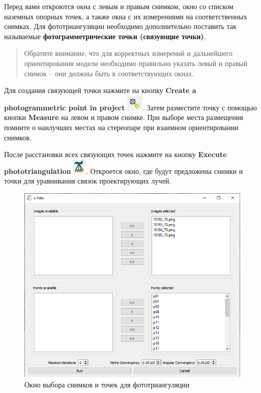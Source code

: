 \documentclass[
  12pt,
]{book}
\begin{document}
Перед вами откроются окна с левым и правым снимком, окно со списком наземных опорных точек, а также окна с их измерениями на соответственных снимках. Для фототриангуляции необходимо дополнительно поставить так называемые \textbf{фотограмметрические точки (связующие точки)}.

\begin{quote}
Обратите внимание, что для корректных измерений и дальнейшего ориентирования модели необходимо правильно указать левый и правый снимок -- они должны быть в соответствующих окнах.
\end{quote}

Для создания связующей точки нажмите на кнопку \textbf{Create a photogrammetric point in project} \includegraphics{images/Ref13/Tie_Point.png}. Затем разместите точку с помощью кнопки \textbf{Measure} на левом и правом снимке. При выборе места размещения помните о наилучших местах на стереопаре при взаимном ориентировании снимков.

После расстановки всех связующих точек нажмите на кнопку \textbf{Execute phototriangulation} \includegraphics{images/Ref13/Execute_EO.png}. Откроется окно, где будут предложены снимки и точки для уравнивания связок проектирующих лучей.

\begin{figure}
\centering
\includegraphics{images/Ref13/Phototriangulation_execution.png}
\caption{Окно выбора снимков и точек для фототриангуляции}
\end{figure}
\end{document}
